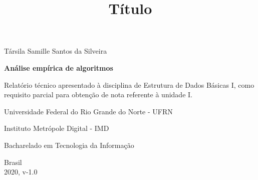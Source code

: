 \documentclass[a4paper, 12pt]{article}
\begin{document}
	\begin{titlepage}
		\begin{center}
			
			
			\large{Társila Samille Santos da Silveira}\\ 
			\vspace{15pt}
			
			\vspace{85pt}
			
			\textbf{\LARGE{Análise empírica de algoritmos}}
			\title{\large{Título}}
			
		\end{center}
		\vspace{1,5cm}
		
		\begin{flushright}
			
			\begin{list}{}{
					\setlength{\leftmargin}{4.5cm}
					\setlength{\rightmargin}{0cm}
					\setlength{\labelwidth}{0pt}
					\setlength{\labelsep}{\leftmargin}}
				
				\item Relatório técnico apresentado à disciplina de Estrutura de Dados Básicas I, como requisito parcial para obtenção de nota referente à unidade I.
				
				
			\end{list}
		\end{flushright}
	\vspace{3cm}
\begin{center}{}
	
	
	
	\item Universidade Federal do Rio Grande do Norte - UFRN \
	\item Instituto Metrópole Digital - IMD \
	\item Bacharelado em Tecnologia da Informação\
	
\end{center}		


		\begin{center}
					\vspace{\fill}
		Brasil\\
		2020, v-1.0
		\end{center}
	\end{titlepage}
	\newpage
	\newpage
	\tableofcontents
	\thispagestyle{empty}
	
\end{document}

